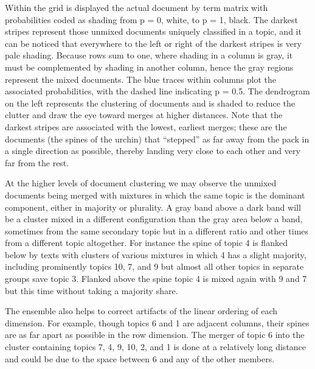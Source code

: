\documentclass[]{book}
\theoremstyle{definition}
\theoremstyle{definition}
\theoremstyle{definition}
\theoremstyle{remark}
\begin{document}
Within the grid is displayed the actual document by term matrix with
probabilities coded as shading from p = 0, white, to p = 1, black. The
darkest stripes represent those unmixed documents uniquely classified in
a topic, and it can be noticed that everywhere to the left or right of
the darkest stripes is very pale shading. Because rows sum to one, where
shading in a column is gray, it must be complemented by shading in
another column, hence the gray regions represent the mixed documents.
The blue traces within columns plot the associated probabilities, with
the dashed line indicating p = 0.5. The dendrogram on the left
represents the clustering of documents and is shaded to reduce the
clutter and draw the eye toward merges at higher distances. Note that
the darkest stripes are associated with the lowest, earliest merges;
these are the documents (the spines of the urchin) that ``stepped'' as
far away from the pack in a single direction as possible, thereby
landing very close to each other and very far from the rest.

At the higher levels of document clustering we may observe the unmixed
documents being merged with mixtures in which the same topic is the
dominant component, either in majority or plurality. A gray band above a
dark band will be a cluster mixed in a different configuration than the
gray area below a band, sometimes from the same secondary topic but in a
different ratio and other times from a different topic altogether. For
instance the spine of topic 4 is flanked below by texts with clusters of
various mixtures in which 4 has a slight majority, including prominently
topics 10, 7, and 9 but almost all other topics in separate groups save
topic 3. Flanked above the spine topic 4 is mixed again with 9 and 7 but
this time without taking a majority share.

The ensemble also helps to correct artifacts of the linear ordering of
each dimension. For example, though topics 6 and 1 are adjacent columns,
their spines are as far apart as possible in the row dimension. The
merger of topic 6 into the cluster containing topics 7, 4, 9, 10, 2, and
1 is done at a relatively long distance and could be due to the space
between 6 and any of the other members.
\end{document}
